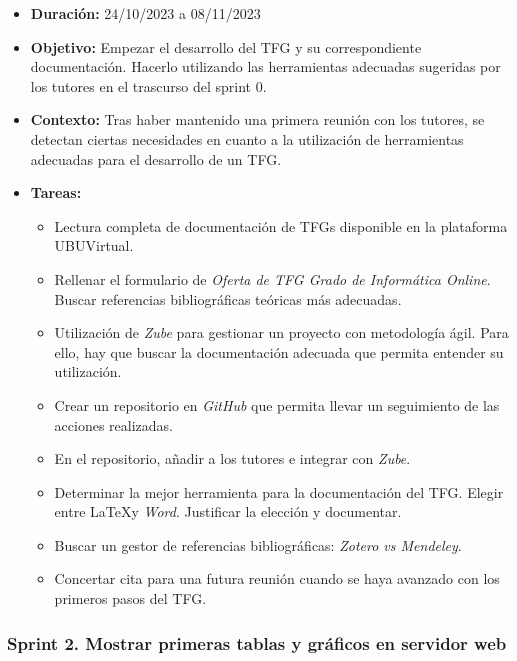 \begin{itemize}
\item  
\textbf{Duración:} 24/10/2023 a 08/11/2023

\item
\textbf{Objetivo:} Empezar el desarrollo del TFG y su correspondiente documentación. Hacerlo utilizando las herramientas adecuadas sugeridas por los tutores en el trascurso del sprint 0. 

\item
\textbf{Contexto:} Tras haber mantenido una primera reunión con los tutores, se detectan ciertas necesidades en cuanto a la utilización de herramientas adecuadas para el desarrollo de un TFG. 

\item
\textbf{Tareas:}
	\begin{itemize}
	\tightlist
	\item 
	Lectura completa de documentación de TFGs disponible en la plataforma UBUVirtual. 
	\item 	
	Rellenar el formulario de \emph{Oferta de TFG Grado de Informática Online}. Buscar referencias bibliográficas teóricas más adecuadas. 
	\item 
	Utilización de \emph{Zube}\citep{online:zube} para gestionar un proyecto con metodología ágil. Para ello, hay que buscar la documentación adecuada que permita entender su utilización.
  	\item 
  	Crear un repositorio en \emph{GitHub} que permita llevar un seguimiento de las acciones realizadas. 
  	\item 
  	En el repositorio, añadir a los tutores e integrar con \emph{Zube}. 
	\item 
	Determinar la mejor herramienta para la documentación del TFG. Elegir entre \LaTeX y \emph{Word}. Justificar la elección y documentar. 
  	\item 
  	Buscar un gestor de referencias bibliográficas: \emph{Zotero vs Mendeley}. 
  	\item 
  	Concertar cita para una futura reunión cuando se haya avanzado con los primeros pasos del TFG.
  	\end{itemize}
\end{itemize}


\subsubsection{Sprint 2. Mostrar primeras tablas y gráficos en servidor web}


